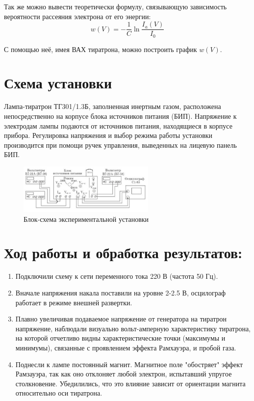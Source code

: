 \documentclass{article}
\begin{document}
Так же можно вывести теоретически формулу, связывающую зависимость вероятности рассеяния электрона от его энергии:
\begin{equation}
w(V) = -\frac{1}{C} \ln \frac{I_a(V)}{I_0}
\end{equation}

С помощью неё, имея ВАХ тиратрона, можно построить график $w(V)$.

\section*{Схема установки}
Лампа-тиратрон ТГ301/1.3Б, заполненная инертным газом, расположена непосредственно на корпусе блока источников питания (БИП). Напряжение к электродам лампы подаются от источников питания, находящиеся в корпусе прибора. Регулировка напряжения и выбор режима работы установки производится при помощи ручек управления, выведенных на лицевую панель БИП.

\begin{figure}[H]
\begin{center}
\includegraphics[width = 0.6\textwidth]{1}
\caption{Блок-схема экспериментальной установки}
\end{center}
\end{figure}

\section*{Ход работы и обработка результатов:}

\begin{enumerate}
	\item Подключили схему к сети переменного тока 220 В (частота 50 Гц).
	\item Вначале напряжения накала поставили на уровне 2-2.5 В, осцилограф работает в режиме внешней развертки.
	\item Плавно увеличивая подаваемое напряжение от генератора на тиратрон напряжение, наблюдали визуально вольт-амперную характеристику тиратрона, на которой отчетливо видны характеристические точки (максимумы и минимумы), связанные с проявлением эффекта Рамхауэра, и пробой газа.
	\item Поднесли к лампе постоянный магнит. Магнитное поле "обостряет" эффект Рамзауэра, так как оно отклоняет любой электрон, испытавший упругое столкновение. Убедилились, что это влияние зависит от ориентации магнита относительно оси тиратрона.
	
\end{enumerate}
\end{document}
